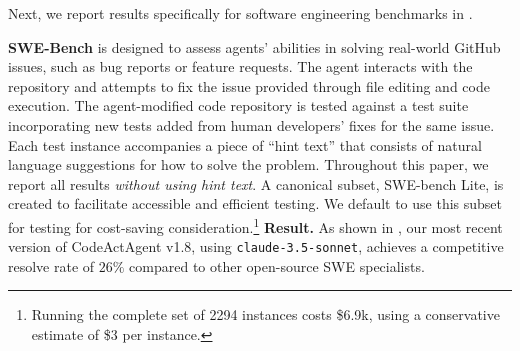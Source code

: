 Next, we report results specifically for software engineering benchmarks in .

\textbf{SWE-Bench} \citep{jimenez2024swebench} is designed to assess agents' abilities in solving real-world GitHub issues, such as bug reports or feature requests.
The agent interacts with the repository and attempts to fix the issue provided through file editing and code execution.
The agent-modified code repository is tested against a test suite incorporating new tests added from human developers' fixes for the same issue.
Each test instance accompanies a piece of ``hint text'' that consists of natural language suggestions for how to solve the problem. Throughout this paper, we report all results \textit{without using hint text}.
A canonical subset, SWE-bench Lite, is created to facilitate accessible and efficient testing. We default to use this subset for testing for cost-saving consideration.\footnote{Running the complete set of 2294 instances costs \$6.9k, using a conservative estimate of \$3 per instance.}
\textbf{Result.} As shown in , our most recent version of CodeActAgent v1.8, using \texttt{claude-3.5-sonnet}, achieves a competitive resolve rate of $26\%$ compared to other open-source SWE specialists.





